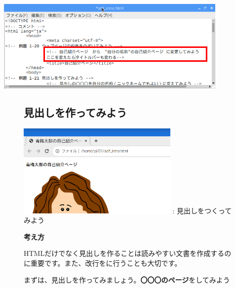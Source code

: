 \documentclass[a4paper,12pt]{jarticle}
\begin{document}
\centering
\includegraphics[width=0.85\textwidth]{textbook-img150.png}


\vfill
\clearpage
\begin{figure}[ht]
  \subsection{\theExercise 見出しを作ってみよう}
  \addtocounter{Exercise}{-1}\label{E:HTML_2}


  \centering
  \begin{minipage}{\textwidth}
    {\upshape
      \includegraphics[width=0.7\textwidth]{textbook-img153.png}
      \newline
      : 見出しをつくってみよう}
  \end{minipage}


  \bigskip
  \flushleft

  \textbf{考え方}



  \begin{minipage}{\textwidth}
    \flushleft

    HTMLだけでなく見出しを作ることは読みやすい文書を作成するのに重要です。また、改行をに行うことも大切です。

    まずは、見出しを作ってみましょう。\textbf{〇〇〇のページ}をしてみよう



\end{minipage}
\end{figure}
\end{document}
